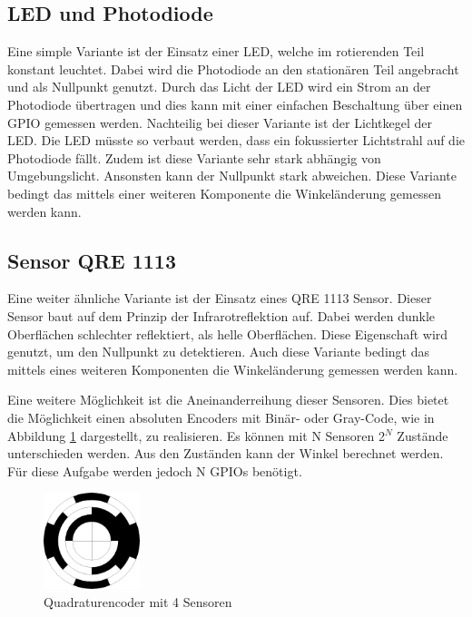 \subsection{LED und Photodiode}
\label{sec:LED}
Eine simple Variante ist der Einsatz einer LED, welche im rotierenden Teil konstant leuchtet. Dabei wird die Photodiode an den stationären Teil angebracht und als Nullpunkt genutzt. Durch das Licht der LED wird ein Strom an der Photodiode übertragen und dies kann mit einer einfachen Beschaltung über einen GPIO gemessen werden. Nachteilig bei dieser Variante ist der Lichtkegel der LED. Die LED müsste so verbaut werden, dass ein fokussierter Lichtstrahl auf die Photodiode fällt. Zudem ist diese Variante sehr stark abhängig von Umgebungslicht. Ansonsten kann der Nullpunkt stark abweichen. Diese Variante bedingt das mittels einer weiteren Komponente die Winkeländerung gemessen werden kann.

\subsection{Sensor QRE 1113}
\label{sec:QRE}
Eine weiter ähnliche Variante ist der Einsatz eines QRE 1113 Sensor. Dieser Sensor baut auf dem Prinzip der Infrarotreflektion auf. Dabei werden dunkle Oberflächen schlechter reflektiert, als helle Oberflächen. Diese Eigenschaft wird genutzt, um den Nullpunkt zu detektieren. Auch diese Variante bedingt das mittels eines weiteren Komponenten die Winkeländerung gemessen werden kann.

Eine weitere Möglichkeit ist die Aneinanderreihung dieser Sensoren. Dies bietet die Möglichkeit einen absoluten Encoders mit Binär- oder Gray-Code, wie in Abbildung \ref{fig:Encoder} dargestellt, zu realisieren. Es können mit N Sensoren 2$^N$ Zustände unterschieden werden. Aus den Zuständen kann der Winkel berechnet werden. Für diese Aufgabe werden jedoch N GPIOs benötigt.
\begin{figure}[H]
	\centering
	\includegraphics[width=0.25\textwidth]{resources/encoder.png}
	\caption[Quadraturencoder mit 4 Sensoren]{Quadraturencoder mit 4 Sensoren}
	\label{fig:Encoder}
\end{figure} 

